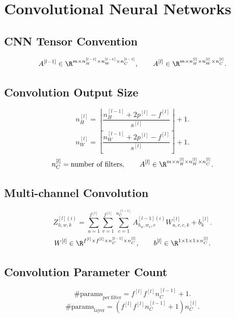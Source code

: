 \section{Convolutional Neural Networks}

\subsection{CNN Tensor Convention}

\[
A^{[l-1]}
\in
\R^{m \times n_H^{[l-1]} \times n_W^{[l-1]} \times n_C^{[l-1]}},
\qquad
A^{[l]}
\in
\R^{m \times n_H^{[l]} \times n_W^{[l]} \times n_C^{[l]}}.
\]

\subsection{Convolution Output Size}

\[
n_H^{[l]}
=
\left\lfloor
\frac{
n_H^{[l-1]} + 2p^{[l]} - f^{[l]}
}{
s^{[l]}
}
\right\rfloor
+1.
\]
\[
n_W^{[l]}
=
\left\lfloor
\frac{
n_W^{[l-1]} + 2p^{[l]} - f^{[l]}
}{
s^{[l]}
}
\right\rfloor
+1.
\]
\[
n_C^{[l]}=\text{number of filters},
\qquad
A^{[l]}
\in
\R^{m \times n_H^{[l]} \times n_W^{[l]} \times n_C^{[l]}}.
\]

\subsection{Multi-channel Convolution}

\[
Z_{h,w,k}^{[l](i)}
=
\sum_{u=1}^{f^{[l]}}
\sum_{v=1}^{f^{[l]}}
\sum_{c=1}^{n_C^{[l-1]}}
A_{h_u,w_v,c}^{[l-1](i)}
W_{u,v,c,k}^{[l]}
+
b_k^{[l]}.
\]
\[
W^{[l]}
\in
\R^{f^{[l]} \times f^{[l]} \times n_C^{[l-1]} \times n_C^{[l]}},
\qquad
b^{[l]}
\in
\R^{1 \times 1 \times 1 \times n_C^{[l]}}.
\]

\subsection{Convolution Parameter Count}

\[
\#\mathrm{params}_{\mathrm{per\ filter}}
=
f^{[l]} f^{[l]} n_C^{[l-1]} + 1.
\]
\[
\#\mathrm{params}_{\mathrm{layer}}
=
\left(
f^{[l]} f^{[l]} n_C^{[l-1]} + 1
\right)
n_C^{[l]}.
\]

